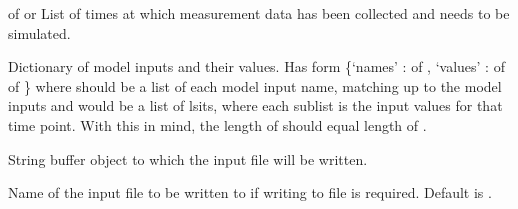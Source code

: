 \documentclass[letterpaper,10pt,english]{sphinxmanual}
\begin{document}
\begin{fulllineitems}
\begin{quote}
\begin{description}
\end{description}\end{quote}

\begin{fulllineitems}
\label{\detokenize{bcmdModel:bayescmd.bcmdModel.input_creation.InputCreator.times}}
 of  or  \textendash{} List of times at which measurement data has been collected and needs
to be simulated.

\end{fulllineitems}


\begin{fulllineitems}
\label{\detokenize{bcmdModel:bayescmd.bcmdModel.input_creation.InputCreator.inputs}}
 \textendash{} Dictionary of model inputs and their values. Has form
\{‘names’ :  of ,
‘values’ :  of  of \}
where  should be a list of each model input name, matching up to
the model inputs and  would be a list of lsits, where each
sublist is the input values for that time point. With this in mind,
the length of  should equal length of .

\end{fulllineitems}


\begin{fulllineitems}
\label{\detokenize{bcmdModel:bayescmd.bcmdModel.input_creation.InputCreator.f_out}}
 \textendash{} String buffer object to which the input file will be written.

\end{fulllineitems}


\begin{fulllineitems}
\label{\detokenize{bcmdModel:bayescmd.bcmdModel.input_creation.InputCreator.filename}}
 \textendash{} Name of the input file to be written to if writing to file is required.
Default is .


\end{fulllineitems}
\end{fulllineitems}
\end{document}
